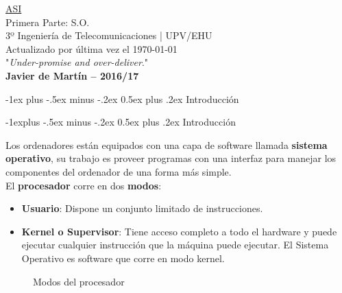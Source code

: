 \documentclass[10pt,portrait, twocolumn]{article}
\makeatletter
\renewcommand{\section}{\@startsection{section}{1}{0mm}%
                                {-1ex plus -.5ex minus -.2ex}%
                                {0.5ex plus .2ex}%
                                {\normalfont\large\bfseries}}
\renewcommand{\subsection}{\@startsection{subsection}{2}{0mm}%
                                {-1explus -.5ex minus -.2ex}%
                                {0.5ex plus .2ex}%
                                {\normalfont\normalsize\bfseries}}
\makeatother
\begin{document}
\begin{framed}
	\begin{center}
    	\Large{\underline{ASI}} \\
	\large{Primera Parte: S.O.} \\
    	\scriptsize{3º Ingeniería de Telecomunicaciones | UPV/EHU}\\
     	Actualizado por última vez el \today \\
     	"\textsl{Under-promise and over-deliver}." \\
     	\small{\textbf{Javier de Martín -- 2016/17}}
	\end{center}
\end{framed}




\section{Introducción}

\subsection{Introducción}


Los ordenadores están equipados con una capa de software llamada \textbf{sistema operativo}, su trabajo es proveer programas con una interfaz para manejar los componentes del ordenador de una forma más simple.\\

El \textbf{procesador} corre en dos \textbf{modos}:

	\begin{itemize}
	\item \textbf{Usuario}: Dispone un conjunto limitado de instrucciones.
	\item \textbf{Kernel o Supervisor}: Tiene acceso completo a todo el hardware y puede ejecutar cualquier instrucción que la máquina puede ejecutar. El Sistema Operativo es software que corre en modo kernel.
	\end{itemize}

\begin{figure}[h]
	\centering
      \caption{Modos del procesador}
  \end{figure}
\end{document}
